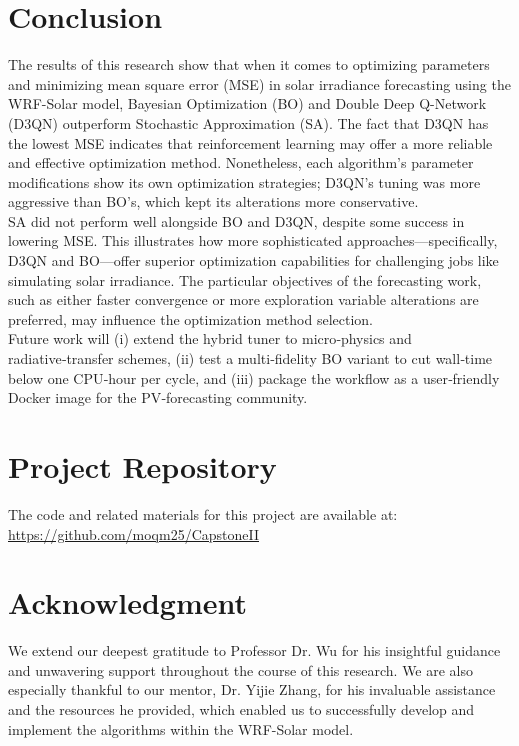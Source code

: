 \documentclass[conference]{IEEEtran}
\begin{document}
\section{Conclusion}
The results of this research show that when it comes to optimizing parameters and minimizing mean square error (MSE) in solar irradiance forecasting using the WRF-Solar model, Bayesian Optimization (BO) and Double Deep Q-Network (D3QN) outperform Stochastic Approximation (SA). The fact that D3QN has the lowest MSE indicates that reinforcement learning may offer a more reliable and effective optimization method. Nonetheless, each algorithm's parameter modifications show its own optimization strategies; D3QN's tuning was more aggressive than BO's, which kept its alterations more conservative.\\
SA did not perform well alongside BO and D3QN, despite some success in lowering MSE. This illustrates how more sophisticated approaches—specifically, D3QN and BO—offer superior optimization capabilities for challenging jobs like simulating solar irradiance. The particular objectives of the forecasting work, such as either faster convergence or more exploration variable alterations are preferred, may influence the optimization method selection.\\
Future work will (i) extend the hybrid tuner to micro‑physics and radiative‑transfer schemes, (ii) test a multi‑fidelity BO variant to cut wall‑time below one CPU‑hour per cycle, and (iii) package the workflow as a user‑friendly Docker image for the PV‑forecasting community.\\


\section*{Project Repository}
The code and related materials for this project are available at: \url{https://github.com/moqm25/CapstoneII}\\


\section*{Acknowledgment}
We extend our deepest gratitude to Professor Dr. Wu for his insightful guidance and unwavering support throughout the course of this research. We are also especially thankful to our mentor, Dr. Yijie Zhang, for his invaluable assistance and the resources he provided, which enabled us to successfully develop and implement the algorithms within the WRF-Solar model.
\end{document}
